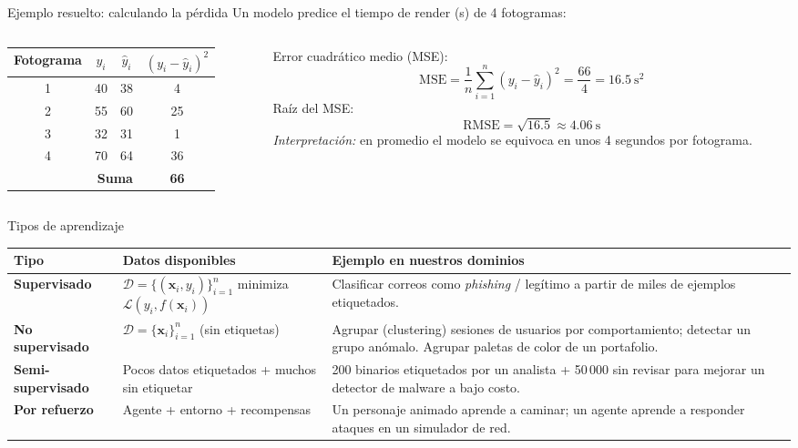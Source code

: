 \documentclass[10pt,aspectratio=169]{beamer}
\begin{document}
\begin{frame}{Ejemplo resuelto: calculando la pérdida}
  Un modelo predice el tiempo de render (s) de 4 fotogramas:
  \medskip
  \begin{columns}[c]
    \begin{column}{0.48\textwidth}
      \centering
      \begin{tabular}{cccc}
        \toprule
        Fotograma & $y_i$ & $\hat{y}_i$ & $(y_i-\hat{y}_i)^2$ \\
        \midrule
        1 & 40 & 38 & 4 \\
        2 & 55 & 60 & 25 \\
        3 & 32 & 31 & 1 \\
        4 & 70 & 64 & 36 \\
        \midrule
        \multicolumn{3}{r}{\textbf{Suma}} & \textbf{66} \\
        \bottomrule
      \end{tabular}
    \end{column}
    \begin{column}{0.48\textwidth}
      Error cuadrático medio (MSE):
      \[
        \text{MSE} = \frac{1}{n}\sum_{i=1}^{n}(y_i-\hat{y}_i)^2 = \frac{66}{4} = 16.5\ \text{s}^2
      \]
      Raíz del MSE:
      \[
        \text{RMSE} = \sqrt{16.5} \approx 4.06\ \text{s}
      \]
      \small\emph{Interpretación:} en promedio el modelo se equivoca en unos 4 segundos por fotograma.
    \end{column}
  \end{columns}
\end{frame}

\begin{frame}{Tipos de aprendizaje}
  \small
  \renewcommand{\arraystretch}{1.35}
  \begin{tabular}{>{\bfseries}p{2.6cm} p{4.2cm} p{6.6cm}}
    \toprule
    Tipo & Datos disponibles & Ejemplo en nuestros dominios \\
    \midrule
    Supervisado & $\mathcal{D}=\{(\mathbf{x}_i,y_i)\}_{i=1}^n$ \newline minimiza $\mathcal{L}(y_i,f(\mathbf{x}_i))$ & Clasificar correos como \emph{phishing} / legítimo a partir de miles de ejemplos etiquetados. \\
    No supervisado & $\mathcal{D}=\{\mathbf{x}_i\}_{i=1}^n$ \newline (sin etiquetas) & Agrupar (clustering) sesiones de usuarios por comportamiento; detectar un grupo anómalo. Agrupar paletas de color de un portafolio. \\
    Semi-supervisado & Pocos datos etiquetados + muchos sin etiquetar & 200 binarios etiquetados por un analista + 50\,000 sin revisar para mejorar un detector de malware a bajo costo. \\
    Por refuerzo & Agente + entorno + recompensas & Un personaje animado aprende a caminar; un agente aprende a responder ataques en un simulador de red. \\
    \bottomrule
  \end{tabular}
\end{frame}
\end{document}
